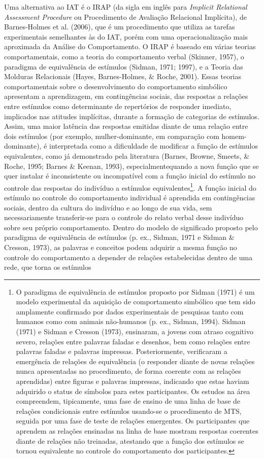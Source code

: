 Uma alternativa ao IAT é o IRAP (da sigla em inglês para \textit{Implicit Relational Assessment Procedure} ou Procedimento de Avaliação Relacional Implícita), de Barnes-Holmes et al. (2006), que é um procedimento que utiliza as tarefas experimentais semelhantes às do IAT, porém com uma operacionalização mais aproximada da Análise do Comportamento. O IRAP é baseado em várias teorias comportamentais, como a teoria do comportamento verbal (Skinner, 1957), o paradigma de equivalência de estímulos (Sidman, 1971; 1997), e a Teoria das Molduras Relacionais (Hayes, Barnes-Holmes, \& Roche, 2001). Essas teorias comportamentais sobre o desenvolvimento do comportamento simbólico apresentam a aprendizagem, em contingências sociais, das respostas a relações entre estímulos como determinante de repertórios de responder imediato, implicados nas atitudes implícitas, durante a formação de categorias de estímulos. Assim, uma maior latência das respostas emitidas diante de uma relação entre dois estímulos (por exemplo, mulher-dominante, em comparação com homem-dominante), é interpretada como a dificuldade de modificar a função de estímulos equivalentes, como já demonstrado pela literatura (Barnes, Browne, Smeets, \& Roche, 1995; Barnes \& Keenan, 1993), especialmente\linebreak quando a nova função que se quer instalar é inconsistente ou incompatível com a função inicial do estímulo no controle das respostas do indivíduo a estímulos equivalentes\footnote{O paradigma de equivalência de estímulos proposto por Sidman (1971) é um modelo experimental da aquisição de comportamento simbólico que tem sido amplamente confirmado por dados experimentais de pesquisas tanto com humanos como com animais não-humanos (p. ex., Sidman, 1994). Sidman (1971) e Sidman e Cresson (1973), ensinaram, a jovens com atraso cognitivo severo, relações entre palavras faladas e desenhos, bem como relações entre palavras faladas e palavras impressas. Posteriormente, verificaram a emergência de relações de equivalência (o responder diante de novas relações nunca apresentadas no procedimento, de forma coerente com as relações aprendidas) entre figuras e palavras impressas, indicando que estas haviam adquirido o status de símbolos para estes participantes. Os estudos na área compreendem, tipicamente, uma fase de ensino de uma linha de base de relações condicionais entre estímulos usando-se o procedimento de MTS, seguida por uma fase de teste de relações emergentes. Os participantes que aprendem as relações ensinadas na linha de base mostram respostas coerentes diante de relações não treinadas, atestando que a função dos estímulos se tornou equivalente no controle do comportamento dos participantes.}. A função inicial do estímulo no controle do comportamento individual é aprendida em contingências sociais, dentro da cultura do indivíduo e ao longo de sua vida, sem necessariamente transferir-se para o controle do relato verbal desse indivíduo sobre seu próprio comportamento. Dentro do modelo de significado proposto pelo paradigma de equivalência de estímulos (p. ex., Sidman, 1971 e Sidman \& Cresson, 1973), as palavras e conceitos podem adquirir a mesma função no controle do comportamento a depender de relações estabelecidas dentro de uma rede, que torna os estímulos 